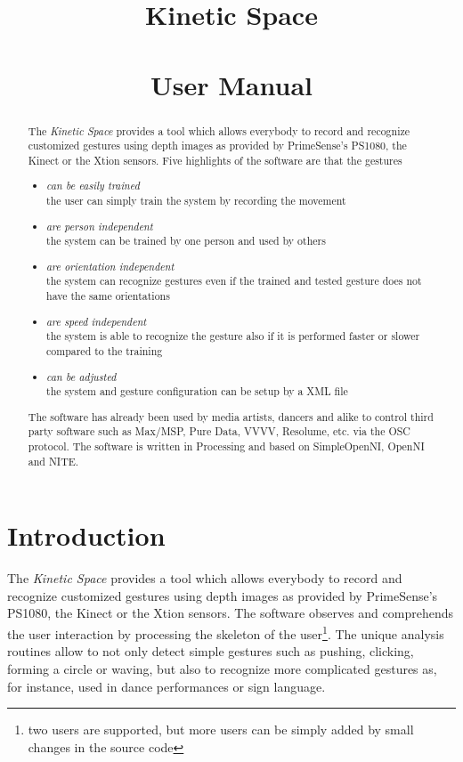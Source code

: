 \documentclass[titlepage,12pt,a4paper]{article}
\title{\Huge \textbf{Kinetic Space}\\\Large~\\User Manual}
\author{}
\date{}
\begin{document}
 \maketitle
 \begin{abstract}

The \emph{Kinetic Space} provides a tool which allows everybody to record 
and recognize customized gestures using depth images as provided by  
PrimeSense's PS1080, the Kinect or the Xtion sensors. Five
highlights of the software are that the gestures

\begin{itemize}
	\item \emph{can be easily trained}\\ the user can simply train the system 
      by recording the movement 

	\item \emph{are person independent}\\ the system can be trained by one 
      person and used by others 

	\item \emph{are orientation independent}\\ the system can recognize gestures even if the trained and tested gesture does not have the same orientations 

	\item \emph{are speed independent}\\ the system is able to recognize the
      gesture also if it is performed faster or slower compared to the training 

	\item \emph{can be adjusted}\\ the system and gesture configuration can be setup by a XML file
\end{itemize}

The software has already been used by media artists, dancers and alike to 
control third party software such as Max/MSP, Pure Data, VVVV, Resolume, etc. 
via the OSC protocol. The software is written in Processing and based on 
SimpleOpenNI, OpenNI and NITE.
 
 \end{abstract}
 \tableofcontents

\newpage

 \section{Introduction}

The \emph{Kinetic Space} provides a tool which allows everybody to record 
and recognize customized gestures using depth images as provided by  
PrimeSense's PS1080, the Kinect or the Xtion sensors. The software observes and comprehends the user interaction by processing the skeleton of the user\footnote{two users are supported, but more users can be simply added by small changes in the source code}. The unique analysis routines allow to not only detect simple gestures such as pushing, clicking, forming a circle or waving, but also to recognize more complicated gestures as, for instance, used in dance performances or sign language.
\end{document}

